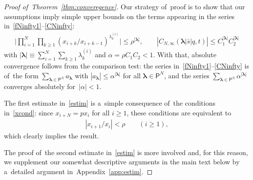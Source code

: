\documentclass[11pt]{article}
\numberwithin{equation}{section}
\newcommand{\vlam}{\boldsymbol{\lambda}}
\newcommand{\bs}{\bar{s}}
\begin{document}
\begin{proof}[Proof of~Theorem~\ref{thm:converegence}]
Our strategy of~proof is to show that our assumptions imply simple upper bounds on the terms appearing in the series in~\eqref{fNinfty1}--\eqref{CNinfty}:
\begin{gather}
\label{estim}
\Bigg|\prod_{i=1}^N\prod_{k\geq 1}(x_{i+k}/x_{i+k-1})^{\lambda^{(i)}_k}\Bigg|\leq \rho^{|\vlam|},\qquad \left|C_{N,\infty}(\vlam|\bs|q,t)\right|\leq C_1^{|\vlam|}C_2^{|\vlam|}
\end{gather}
with $|\vlam|\equiv \sum_{i=1}^N \sum_{k\geq 1}\lambda^{(i)}_k$ and $\alpha = \rho C_1C_2<1$.
With that, absolute convergence follows from the comparison test: the series in~\eqref{fNinfty1}--\eqref{CNinfty} is of~the form $\sum_{\vlam\in\mathsf{P}^N} a_{\vlam}$ with $|a_{\vlam}|\leq \alpha^{|\vlam|}$ for all $\vlam\in\mathsf{P}^N$,
and the series $\sum_{\vlam\in\mathsf{P}^N} \alpha^{|\vlam|}$ converges absolutely for~$|\alpha|<1$.

The first estimate in~\eqref{estim} is a~simple consequence of~the conditions in~\eqref{xcond}: since \allowbreak \mbox{$x_{i+N}=px_i$} for all $i\geq 1$, these conditions are equivalent to
\begin{gather*}
|x_{i+1}/x_i| < \rho\qquad (i\geq 1) ,
\end{gather*}
which clearly implies the result.

The proof of~the second estimate in~\eqref{estim} is more involved and, for this reason, we supplement our somewhat descriptive arguments in the main text below by a~detailed argument in~Appendix~\ref{app:estim}.


\end{proof}
\end{document}
